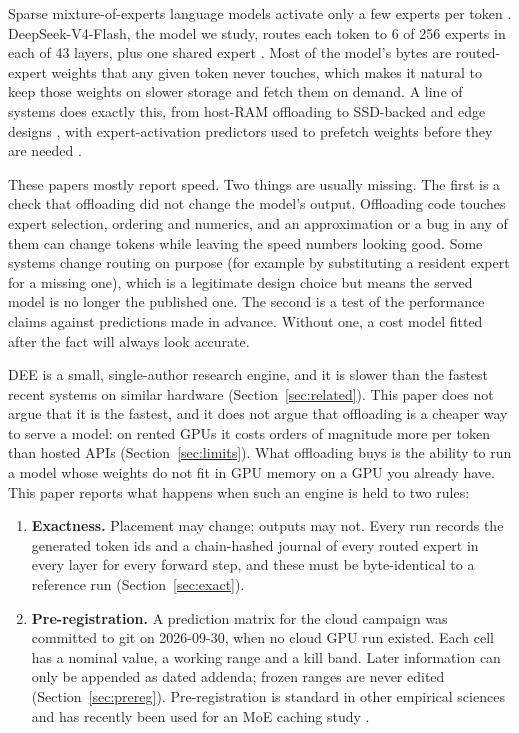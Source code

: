 \documentclass[11pt]{article}
\newcommand{\dee}{\textsc{DEE}}
\begin{document}
Sparse mixture-of-experts language models activate only a few experts per token
\citep{shazeer2017outrageously,lepikhin2021gshard,fedus2022switch,dai2024deepseekmoe}.
DeepSeek-V4-Flash, the model we study, routes each token to 6 of 256 experts in
each of 43 layers, plus one shared expert \citep{dsv4flash}. Most of the model's
bytes are routed-expert weights that any given token never touches, which makes
it natural to keep those weights on slower storage and fetch them on demand. A
line of systems does exactly this, from host-RAM offloading
\citep{eliseev2023mixtral,xue2024moeinfinity,kamahori2024fiddler,cao2024moelightning}
to SSD-backed and edge designs
\citep{yi2023edgemoe,alizadeh2024llminaflash,song2024powerinfer},
with expert-activation predictors used to prefetch weights before they are
needed \citep{hwang2024pregated,song2024promoe,he2024expertflow,wang2026seqmoe}.

These papers mostly report speed. Two things are usually missing. The first is a
check that offloading did not change the model's output. Offloading code touches
expert selection, ordering and numerics, and an approximation or a bug in any of
them can change tokens while leaving the speed numbers looking good. Some
systems change routing on purpose (for example by substituting a resident
expert for a missing one), which is a legitimate design choice but means the
served model is no longer the published one. The second is a test of the
performance claims against predictions made in advance. Without one, a cost
model fitted after the fact will always look accurate.

\dee{} is a small, single-author research engine, and it is slower than the
fastest recent systems on similar hardware (Section~\ref{sec:related}). This
paper does not argue that it is the fastest, and it does not argue that
offloading is a cheaper way to serve a model: on rented GPUs it costs orders of
magnitude more per token than hosted APIs (Section~\ref{sec:limits}). What
offloading buys is the ability to run a model whose weights do not fit in GPU
memory on a GPU you already have. This paper reports what happens when such an
engine is held to two rules:

\begin{enumerate}
\item \textbf{Exactness.} Placement may change; outputs may not. Every run
records the generated token ids and a chain-hashed journal of every routed
expert in every layer for every forward step, and these must be byte-identical
to a reference run (Section~\ref{sec:exact}).
\item \textbf{Pre-registration.} A prediction matrix for the cloud campaign was
committed to git on 2026-09-30, when no cloud GPU run existed. Each cell has a
nominal value, a working range and a kill band. Later information can only be
appended as dated addenda; frozen ranges are never edited
(Section~\ref{sec:prereg}). Pre-registration is standard in other empirical
sciences \citep{nosek2018preregistration} and has recently been used for an MoE
caching study \citep{suram2026cacheable}.
\end{enumerate}
\end{document}
